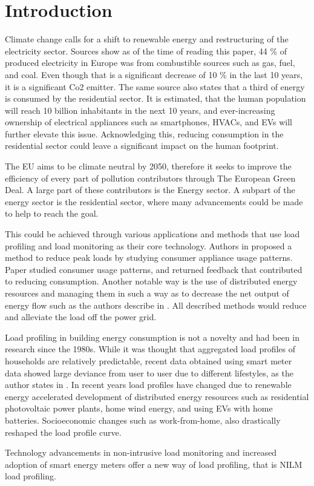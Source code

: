 \chapter{Introduction}
\label{chapter1}

Climate change calls for a shift to renewable energy and restructuring of the electricity sector.
Sources \cite{eurostat2020} show as of the time of reading this paper, 44 \% of produced electricity in Europe was from combustible sources such as gas, fuel, and coal. Even 
though that is a significant decrease of 10 \% in the last 10 years, it is a significant Co2 emitter.
The same source \cite{eurostat2020} also states that a third of energy is consumed by the residential sector. It is estimated, 
that the human population will reach 10 billion inhabitants in the next 10 years, and ever-increasing ownership of electrical appliances such as smartphones, HVACs, and EVs will further elevate this issue.
Acknowledging this, reducing consumption in the residential sector could leave a significant impact on the human footprint. 


The EU aims to be climate neutral by 2050, therefore it seeks to improve the efficiency of every part of pollution contributors through The European Green Deal.
A large part of these contributors is the Energy sector.
A subpart of the energy sector is the residential sector, where many advancements could be made to help to reach the goal.  

This could be achieved through various applications and methods that use load profiling and load monitoring as their core technology.
Authors in \cite{Chuan2014} proposed a method to reduce peak loads by studying consumer
appliance usage patterns. Paper \cite{Csoknyai2019} studied consumer usage patterns, and returned feedback that contributed to reducing consumption.
Another notable way is the use of distributed energy resources and managing them in such a way as to decrease the net output of energy flow such as the authors describe in
\cite{MORENOJARAMILLO2021445}. All described methods would reduce and alleviate the load off the power grid.

Load profiling in building energy consumption is not a novelty and had been in research since the 1980s.
While it was thought that aggregated load profiles of households are relatively predictable, recent data obtained using smart meter data showed large deviance from user to user due to different lifestyles, as the author states in \cite{Review2021}.
In recent years load profiles have changed due to renewable energy accelerated development of distributed energy resources such as residential photovoltaic
power plants, home wind energy, and using EVs with home batteries. Socioeconomic changes such as work-from-home, also drastically reshaped the load profile curve. 

Technology advancements in non-intrusive load monitoring and increased adoption of smart energy meters offer a new
way of load profiling, that is NILM load profiling.
